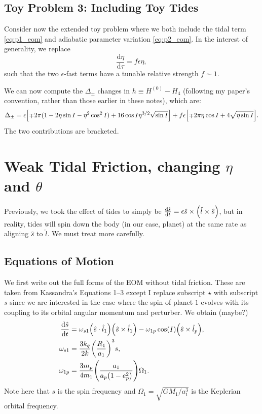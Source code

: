 \documentclass[11pt,
        usenames, %
        dvipsnames %
    ]{article}
\newcommand*{\rd}[2]{\frac{\mathrm{d}#1}{\mathrm{d}#2}}
\DeclarePairedDelimiter\p{\lparen}{\rparen}
\DeclarePairedDelimiter\s{\lbrack}{\rbrack}
\begin{document}
\subsection{Toy Problem 3: Including Toy Tides}

Consider now the extended toy problem where we both include the tidal term
\autoref{eq:p1_eom} and adiabatic parameter variation \autoref{eq:p2_eom}. In
the interest of generality, we replace
\begin{equation}
    \rd{\eta}{\tau} = f \epsilon \eta,
\end{equation}
such that the two $\epsilon$-fast terms have a tunable relative strength
$f \sim 1$.

We can now compute the $\Delta_{\pm}$ changes in $h \equiv H^{(0)} - H_4$
(following my paper's convention, rather than those earlier in these notes),
which are:
\begin{equation}
    \Delta_{\pm} = \epsilon\s*{\mp 2\pi \p{1 - 2\eta \sin I - \eta^2 \cos^2 I} +
        16\cos I\eta^{3/2}\sqrt{\sin I}} + f\epsilon
            \s*{\mp 2\pi \eta \cos I + 4\sqrt{\eta \sin I}}.
\end{equation}
The two contributions are bracketed.

\section{Weak Tidal Friction, changing $\eta$ and $\theta$}

Previously, we took the effect of tides to simply be $\rd{\hat{s}}{t} = \epsilon
\hat{s} \times \p*{\hat{l} \times \hat{s}}$, but in reality, tides will spin
down the body (in our case, planet) at the same rate as aligning $\hat{s}$ to
$\hat{l}$. We must treat more carefully.

\subsection{Equations of Motion}

We first write out the full forms of the EOM without tidal friction. These are
taken from Kassandra's Equations 1--3 except I replace subscript $\star$ with
subscript $s$ since we are interested in the case where the spin of planet $1$
evolves with its coupling to its orbital angular momentum and perturber. We
obtain (maybe?)
\begin{align}
    \rd{\hat{s}}{t}
        &= \omega_{s1}\p*{\hat{s} \cdot \hat{l}_1}\p*{\hat{s} \times \hat{l}_1}
            - \omega_{1p}\cos(I)\p*{\hat{s} \times \hat{l}_p},\\
    \omega_{s1} &= \frac{3k_q}{2k} \p*{\frac{R_1}{a_1}}^3 s,\\
    \omega_{1p} &= \frac{3m_p}{4m_1}\p*{\frac{a_1}{a_p\p*{1 - e_p^2}}} \Omega_1.
\end{align}
Note here that $s$ is the spin frequency and $\Omega_1 =
\sqrt{GM_1/a_1^3}$ is the Keplerian orbital frequency.
\end{document}
